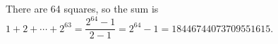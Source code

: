 There are 64 squares, so the sum is $1+2+\cdots+2^{63}=\dfrac{2^{64}-1}{2-1}=\boxed{2^{64}-1=18446744073709551615}$.
